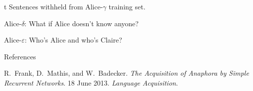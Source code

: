\par\nobreak\medskip
{}
\par\nobreak\medskip
\caption/t Sentences withheld from Alice-$\gamma$ training set.

\ssec Alice-$\delta$: What if Alice doesn't know anyone?

\ssec Alice-$\varepsilon$: Who's Alice and who's Claire?

\sec References

\bib [Frank2013] R.\ Frank, D.\ Mathis, and W.\ Badecker. {\em The Acquisition of Anaphora by Simple Recurrent Networks}. 18 June 2013. {\em Language Acquisition}.

\bye